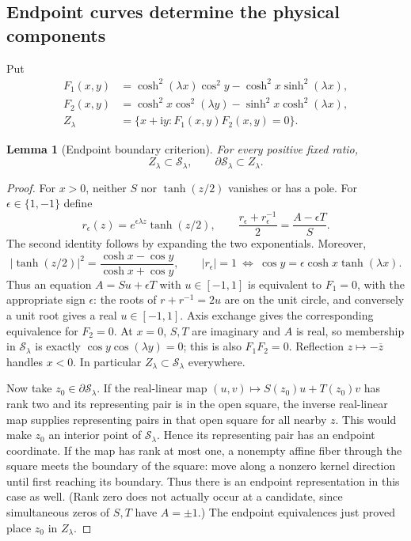 \documentclass[11pt]{article}
\numberwithin{equation}{section}
\newtheorem{lemma}[theorem]{Lemma}
\theoremstyle{definition}
\newcommand{\ii}{\mathrm i}
\newcommand{\cS}{\mathcal S}
\begin{document}
\subsection{Endpoint curves determine the physical components}

Put
\begin{align}
 F_1(x,y)&=\cosh^2(\lambda x)\cos^2y
             -\cosh^2x\sinh^2(\lambda x),\label{eq:F1}\\
 F_2(x,y)&=\cosh^2x\cos^2(\lambda y)
             -\sinh^2x\cosh^2(\lambda x),\label{eq:F2}\\
 Z_\lambda&=\{x+\ii y:F_1(x,y)F_2(x,y)=0\}.
 \label{eq:endpointlocus}
\end{align}

\begin{lemma}[Endpoint boundary criterion]\label{lem:endpoint-sandwich}
For every positive fixed ratio,
\begin{equation}\label{eq:endpoint-sandwich}
 Z_\lambda\subset\cS_\lambda,
 \qquad \partial\cS_\lambda\subset Z_\lambda.
\end{equation}
\end{lemma}
\begin{proof}
For $x>0$, neither $S$ nor $\tanh(z/2)$ vanishes or has a pole.
For $\epsilon\in\{1,-1\}$ define
\begin{equation}\label{eq:endpointroot}
 r_\epsilon(z)=e^{\epsilon\lambda z}\tanh(z/2),
 \qquad
 \frac{r_\epsilon+r_\epsilon^{-1}}2
       =\frac{A-\epsilon T}{S}.
\end{equation}
The second identity follows by expanding the two exponentials.
Moreover,
\[
 |\tanh(z/2)|^2=\frac{\cosh x-\cos y}{\cosh x+\cos y},
 \qquad
 |r_\epsilon|=1
 \ \Longleftrightarrow\ 
 \cos y=\epsilon\cosh x\tanh(\lambda x).
\]
Thus an equation $A=Su+\epsilon T$ with $u\in[-1,1]$ is
equivalent to $F_1=0$, with the appropriate sign $\epsilon$:
the roots of $r+r^{-1}=2u$ are on the unit circle, and conversely
a unit root gives a real $u\in[-1,1]$.
Axis exchange gives the corresponding equivalence for $F_2=0$.
At $x=0$, $S,T$ are imaginary and $A$ is real, so membership in
$\cS_\lambda$ is exactly $\cos y\cos(\lambda y)=0$; this is
also $F_1F_2=0$.  Reflection $z\mapsto-\overline z$ handles
$x<0$.  In particular $Z_\lambda\subset\cS_\lambda$ everywhere.

Now take $z_0\in\partial\cS_\lambda$.  If the real-linear map
$(u,v)\mapsto S(z_0)u+T(z_0)v$ has rank two and its representing
pair is in the open square, the inverse real-linear map supplies
representing pairs in that open square for all nearby $z$.
This would make $z_0$ an interior point of $\cS_\lambda$.
Hence its representing pair has an endpoint coordinate.
If the map has rank at most one, a nonempty affine fiber through
the square meets the boundary of the square: move along a nonzero
kernel direction until first reaching its boundary.  Thus there
is an endpoint representation in this case as well.  (Rank zero
does not actually occur at a candidate, since simultaneous zeros
of $S,T$ have $A=\pm1$.)  The endpoint equivalences just proved
place $z_0$ in $Z_\lambda$.
\end{proof}
\end{document}
